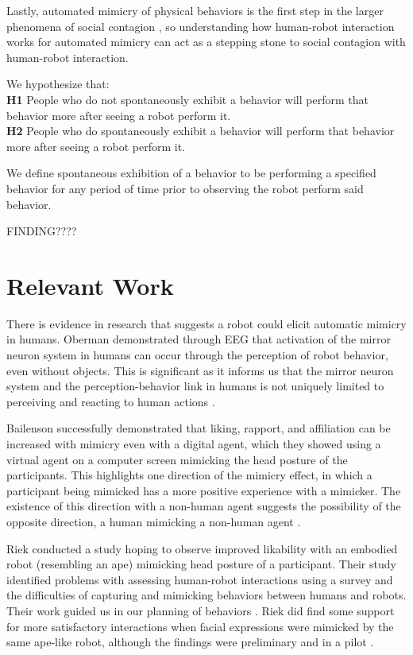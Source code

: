 \documentclass{acm_proc_article-sp}
\begin{document}
Lastly, automated mimicry of physical behaviors is the first step in the larger phenomena of social contagion \cite{chartrand2013antecedents}, so understanding how human-robot interaction works for automated mimicry can act as a stepping stone to social contagion with human-robot interaction.

We hypothesize that:\\
\textbf{H1}	People who do not spontaneously exhibit a behavior will perform that behavior more after seeing a robot perform it.\\
\textbf{H2} People who do spontaneously exhibit a behavior will perform that behavior more after seeing a robot perform it.

We define spontaneous exhibition of a behavior to be performing a specified behavior for any period of time prior to observing the robot perform said behavior.

FINDING????

\section{Relevant Work}
There is evidence in research that suggests a robot could elicit automatic mimicry in humans. Oberman demonstrated through EEG that activation of the mirror neuron system in humans can occur through the perception of robot behavior, even without objects. This is significant as it informs us that the mirror neuron system and the perception-behavior link in humans is not uniquely limited to perceiving and reacting to human actions \cite{oberman2007eeg}. 

Bailenson successfully demonstrated that liking, rapport, and affiliation can be increased with mimicry even with a digital agent, which they showed using a virtual agent on a computer screen mimicking the head posture of the participants. This highlights one direction of the mimicry effect, in which a participant being mimicked has a more positive experience with a mimicker. The existence of this direction with a non-human agent suggests the possibility of the opposite direction, a human mimicking a non-human agent \cite{bailenson2005digital}. 

Riek conducted a study hoping to observe improved likability with an embodied robot (resembling an ape) mimicking head posture of a participant. Their study identified problems with assessing human-robot interactions using a survey and the difficulties of capturing and mimicking behaviors between humans and robots. Their work guided us in our planning of behaviors \cite{riek2010my}. Riek did find some support for more satisfactory interactions when facial expressions were mimicked by the same ape-like robot, although the findings were preliminary and in a pilot \cite{riek2008real}.
\end{document}
